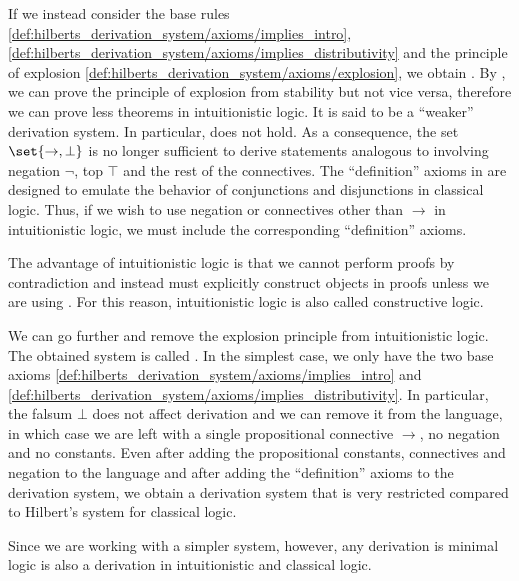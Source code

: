 \begin{remark}
\begin{remenum}
    If we instead consider the base rules \eqref{def:hilberts_derivation_system/axioms/implies_intro}, \eqref{def:hilberts_derivation_system/axioms/implies_distributivity} and the principle of explosion \eqref{def:hilberts_derivation_system/axioms/explosion}, we obtain . By , we can prove the principle of explosion from stability but not vice versa, therefore we can prove less theorems in intuitionistic logic. It is said to be a \enquote{weaker} derivation system. In particular,  does not hold. As a consequence, the set \( \set{ \to, \bot } \) is no longer sufficient to derive statements analogous to  involving negation \( \neg \), top \( \top \) and the rest of the connectives. The \enquote{definition} axioms in  are designed to emulate the behavior of conjunctions and disjunctions in classical logic. Thus, if we wish to use negation or connectives other than \( \to \) in intuitionistic logic, we must include the corresponding \enquote{definition} axioms.

    The advantage of intuitionistic logic is that we cannot perform proofs by contradiction and instead must explicitly construct objects in proofs unless we are using . For this reason, intuitionistic logic is also called constructive logic.

     We can go further and remove the explosion principle from intuitionistic logic. The obtained system is called . In the simplest case, we only have the two base axioms \eqref{def:hilberts_derivation_system/axioms/implies_intro} and \eqref{def:hilberts_derivation_system/axioms/implies_distributivity}. In particular, the falsum \( \bot \) does not affect derivation and we can remove it from the language, in which case we are left with a single propositional connective \( \to \), no negation and no constants. Even after adding the propositional constants, connectives and negation to the language and after adding the \enquote{definition} axioms to the derivation system, we obtain a derivation system that is very restricted compared to Hilbert's system for classical logic.

    Since we are working with a simpler system, however, any derivation is minimal logic is also a derivation in intuitionistic and classical logic.
  \end{remenum}
\end{remark}


